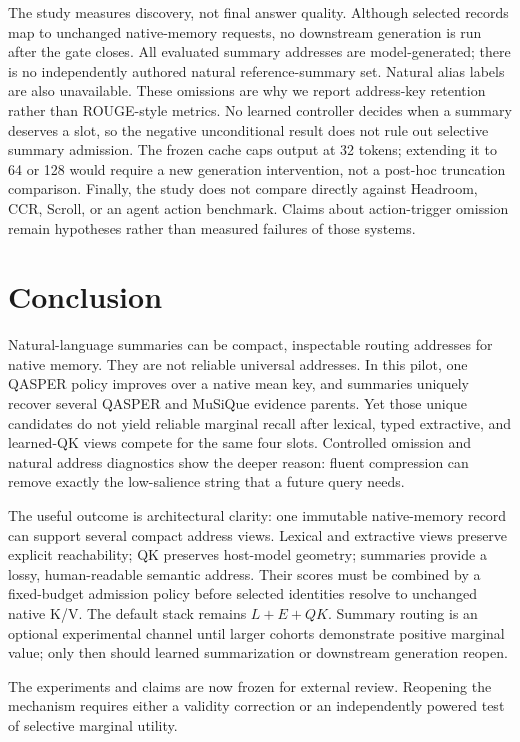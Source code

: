 \documentclass[11pt]{article}
\newcommand{\kv}{K/V\xspace}
\begin{document}
The study measures discovery, not final answer quality. Although selected
records map to unchanged native-memory requests, no downstream generation is
run after the gate closes. All evaluated summary addresses are model-generated;
there is no independently authored natural reference-summary set. Natural alias
labels are also unavailable. These omissions are why we report address-key
retention rather than ROUGE-style metrics. No learned controller decides when a
summary deserves a slot, so the negative unconditional result does not rule out
selective summary admission. The frozen cache caps output at 32 tokens;
extending it to 64 or 128 would require a new generation intervention, not a
post-hoc truncation comparison. Finally, the study does not compare directly
against Headroom, CCR, Scroll, or an agent action benchmark. Claims about
action-trigger omission remain hypotheses rather than measured failures of
those systems.

\section{Conclusion}

Natural-language summaries can be compact, inspectable routing addresses for native memory. They are not reliable universal addresses. In this pilot, one QASPER policy improves over a native mean key, and summaries uniquely recover several QASPER and MuSiQue evidence parents. Yet those unique candidates do not yield reliable marginal recall after lexical, typed extractive, and learned-QK views compete for the same four slots. Controlled omission and natural address diagnostics show the deeper reason: fluent compression can remove exactly the low-salience string that a future query needs.

The useful outcome is architectural clarity: one immutable native-memory record
can support several compact address views. Lexical and extractive views preserve
explicit reachability; QK preserves host-model geometry; summaries provide a
lossy, human-readable semantic address. Their scores must be combined by a
fixed-budget admission policy before selected identities resolve to unchanged
native \kv. The default stack remains $L+E+QK$. Summary routing is an optional
experimental channel until larger cohorts demonstrate positive marginal value;
only then should learned summarization or downstream generation reopen.

The experiments and claims are now frozen for external review. Reopening the
mechanism requires either a validity correction or an independently powered
test of selective marginal utility.
\end{document}
